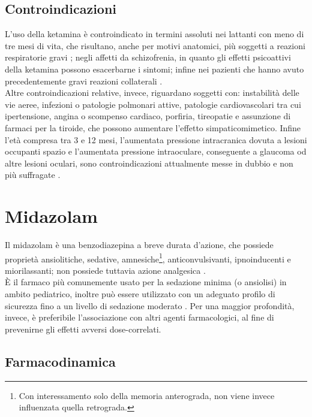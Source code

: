 \subsection*{Controindicazioni}

L'uso della ketamina è controindicato in termini assoluti nei lattanti con meno di tre mesi di vita, che risultano, anche per motivi anatomici, più soggetti a reazioni respiratorie gravi \cite{Zanos2018}; negli affetti da schizofrenia, in quanto gli effetti psicoattivi della ketamina possono esacerbarne i sintomi; infine nei pazienti che hanno avuto precedentemente gravi reazioni collaterali \cite{Uptodatepharmacology}.
\\Altre controindicazioni relative, invece, riguardano soggetti con: instabilità delle vie aeree, infezioni o patologie polmonari attive, patologie cardiovascolari tra cui ipertensione, angina o scompenso cardiaco, porfiria, tireopatie e assunzione di farmaci per la tiroide, che possono aumentare l'effetto simpaticomimetico. Infine l'età compresa tra 3 e 12 mesi, l'aumentata pressione intracranica dovuta a lesioni occupanti spazio e l'aumentata pressione intraoculare, conseguente a glaucoma od altre lesioni oculari, sono controindicazioni attualmente messe in dubbio e non più suffragate \cite{Green2011, Simeupsedazione}.   

\section{Midazolam}

Il midazolam è una benzodiazepina a breve durata d'azione, che possiede proprietà ansiolitiche, sedative, amnesiche\footnote{Con interessamento solo della memoria anterograda, non viene invece influenzata quella retrograda.}, anticonvulsivanti, ipnoinducenti e miorilassanti; non possiede tuttavia azione analgesica \cite{Krauss2006}. 
\\ \`E il farmaco più comunemente usato per la sedazione minima (o ansiolisi) in ambito pediatrico, inoltre può essere utilizzato con un adeguato profilo di sicurezza fino a un livello di sedazione moderato \cite{Manso2019}. Per una maggior profondità, invece, è preferibile l'associazione con altri agenti farmacologici, al fine di prevenirne gli effetti avversi dose-correlati.

\subsection*{Farmacodinamica}

